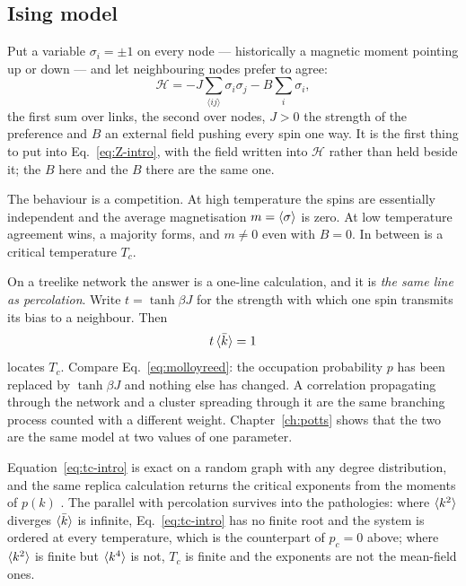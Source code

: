 \subsection{Ising model}
\label{sec:ising-intro}

Put a variable $\sigma_{i}=\pm1$ on every node --- historically a magnetic
moment pointing up or down --- and let neighbouring nodes prefer to agree:
\begin{equation}
  \mathcal{H}=-J\sum_{\langle ij\rangle}\sigma_{i}\sigma_{j}
              -B\sum_{i}\sigma_{i},
  \label{eq:ising-intro}
\end{equation}
the first sum over links, the second over nodes, $J>0$ the strength of the
preference and $B$ an external field pushing every spin one way. It is the first
thing to put into Eq.~\eqref{eq:Z-intro}, with the field written into
$\mathcal{H}$ rather than held beside it; the $B$ here and the $B$ there are the
same one.

The behaviour is a competition. At high temperature the spins are essentially
independent and the average magnetisation $m=\langle \sigma \rangle$ is zero. At low
temperature agreement wins, a majority forms, and $m\ne0$ even with $B=0$. In
between is a critical temperature $T_{c}$.

On a treelike network the answer is a one-line calculation, and it is
\emph{the same line as percolation}. Write $t=\tanh\beta J$ for the strength
with which one spin transmits its bias to a neighbour. Then
\begin{equation}
  t\,\langle \bar k \rangle=1
  \label{eq:tc-intro}
\end{equation}
locates $T_{c}$. Compare Eq.~\eqref{eq:molloyreed}: the occupation probability
$p$ has been replaced by $\tanh\beta J$ and nothing else has changed. A
correlation propagating through the network and a cluster spreading through it
are the same branching process counted with a different weight.
Chapter~\ref{ch:potts} shows that the two are the same model at two values of
one parameter.

Equation~\eqref{eq:tc-intro} is exact on a random graph with any degree
distribution, and the same replica calculation returns the critical exponents
from the moments of $p(k)$ \citep{leone2002}. The parallel with percolation
survives into the pathologies: where $\langle k^{2} \rangle$ diverges $\langle \bar k \rangle$ is
infinite, Eq.~\eqref{eq:tc-intro} has no finite root and the system is ordered
at every temperature, which is the counterpart of $p_{c}=0$ above; where
$\langle k^{2} \rangle$ is finite but $\langle k^{4} \rangle$ is not, $T_{c}$ is finite and the
exponents are not the mean-field ones.

